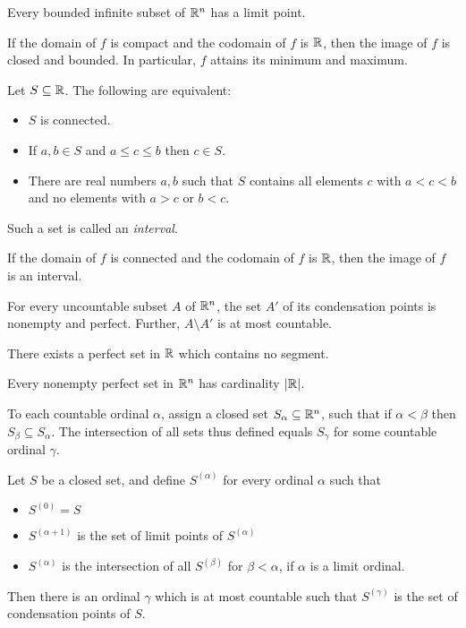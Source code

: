 \begin{cor}[Weierstrass]
  Every bounded infinite subset of $\mathbb{R}^n$ has a limit point.
\end{cor}
\begin{cor}
    If the domain of $f$ is compact and the codomain of $f$ is $\mathbb{R}$, then the
    image of $f$ is closed and bounded. In particular, $f$ attains its minimum
    and maximum.
\end{cor}
\begin{prop}
    Let $S\subseteq\mathbb{R}$. The following are equivalent:
    \begin{itemize}
        \item $S$ is connected.
        \item If $a,b\in S$ and $a\le c\le b$ then $c\in S$.
        \item There are real numbers $a,b$ such that $S$ contains all elements
            $c$ with $a<c<b$ and no elements with $a>c$ or $b<c$.
    \end{itemize}
\end{prop}
\begin{defn}
    Such a set is called an \emph{interval}. 
\end{defn}
\begin{cor}
    If the domain of $f$ is connected and the codomain of $f$ is $\mathbb{R}$, then the
    image of $f$ is an interval.
\end{cor}
\begin{prop}
    For every uncountable subset $A$ of $\mathbb{R}^n$, the set $A'$ of its condensation
    points is nonempty and perfect. Further, $A\setminus A'$ is at most
    countable.
\end{prop}
\begin{prop}
    There exists a perfect set in $\mathbb{R}$ which contains no segment.
\end{prop}
\begin{prop}
    Every nonempty perfect set in $\mathbb{R}^n$ has cardinality $|\mathbb{R}|$.
\end{prop}
\begin{thm}[Baire]
    To each countable ordinal $\alpha$, assign a closed set
    $S_\alpha\subseteq\mathbb{R}^n$, such that if $\alpha<\beta$ then $S_\beta\subseteq S_\alpha$.
    The intersection of all sets thus defined equals $S_\gamma$ for some
    countable ordinal $\gamma$.
\end{thm}
\begin{cor}
    Let $S$ be a closed set, and define $S^{(\alpha)}$ for every ordinal
    $\alpha$ such that
    \begin{itemize}
        \item $S^{(0)}=S$
        \item $S^{(\alpha+1)}$ is the set of limit points of $S^{(\alpha)}$
        \item $S^{(\alpha)}$ is the intersection of all $S^{(\beta)}$ for
            $\beta<\alpha$, if $\alpha$ is a limit ordinal.
    \end{itemize}
    Then there is an ordinal $\gamma$ which is at most countable such that
    $S^{(\gamma)}$ is the set of condensation points of $S$.
\end{cor}
